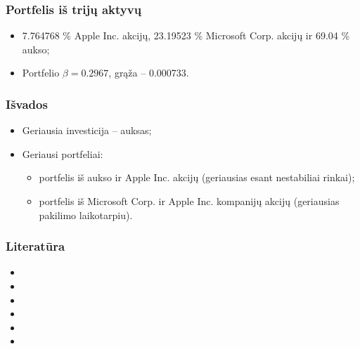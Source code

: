 \documentclass[utf8,hyperref={unicode},xcolor=dvipsnames]{beamer}
\theoremstyle{change}\newtheorem{teorema}{Teiginys}
\theoremstyle{change}\newtheorem{salyga}{}
\newcommand{\HH}{\mathrm{H}} %
\newcommand{\Hao}{\HH_{\alpha}^o}
\begin{document}
\begin{frame}
    \frametitle{Portfelis iš trijų aktyvų}
    \begin{itemize}
	\item 7.764768 \% Apple Inc. akcijų, 23.19523 \% Microsoft Corp. akcijų ir
69.04 \% aukso;
	\item Portfelio $\beta= 0.2967$, grąža -- 0.000733.
    \end{itemize}
\end{frame}

\begin{frame}
    \frametitle{Išvados} 

    \begin{itemize}
\item Geriausia investicija  -- auksas;

\item Geriausi portfeliai: 
\begin{itemize}
	\item portfelis iš aukso ir Apple Inc. akcijų (geriausias esant nestabiliai rinkai);
	\item portfelis iš Microsoft Corp. ir Apple Inc. kompanijų akcijų (geriausias pakilimo laikotarpiu).
\end{itemize}
    \end{itemize}

\end{frame}


\begin{frame}
    \frametitle{Literatūra} 
    \begin{itemize}
	\item 
\item 
 \item 
   \item  
\item 
\item 
    \end{itemize}
 \end{frame}
 
\end{document}
